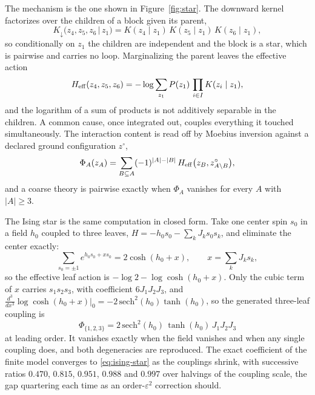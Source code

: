 \documentclass[11pt,letterpaper]{article}
\begin{document}
The mechanism is the one shown in Figure~\ref{fig:star}. The downward kernel
factorizes over the children of a block given its parent,
\begin{equation}
K_\downarrow\big(z_4,z_5,z_6\,\big\vert\,z_1\big)
= K(z_4\mid z_1)\,K(z_5\mid z_1)\,K(z_6\mid z_1),
\label{eq:star-factorized}
\end{equation}
so conditionally on $z_1$ the children are independent and the block is a star,
which is pairwise and carries no loop. Marginalizing the parent leaves the
effective action
\begin{equation}
H_{\rm eff}(z_4,z_5,z_6)
= -\log\sum_{z_1}P(z_1)\,\prod_{i\in I}K(z_i\mid z_1),
\label{eq:star-marginal}
\end{equation}
and the logarithm of a sum of products is not additively separable in the
children. A common cause, once integrated out, couples everything it touched
simultaneously. The interaction content is read off by Moebius inversion against a
declared ground configuration $z^\circ$,
\begin{equation}
\Phi_A(z_A)=\sum_{B\subseteq A}(-1)^{|A|-|B|}\,
H_{\rm eff}\big(z_B,z^\circ_{A\setminus B}\big),
\label{eq:mobius}
\end{equation}
and a coarse theory is pairwise exactly when $\Phi_A$ vanishes for every $A$ with
$|A|\ge3$.

The Ising star is the same computation in closed form. Take one center spin
$s_0$ in a field $h_0$ coupled to three leaves,
$H=-h_0s_0-\sum_{k}J_ks_0s_k$, and eliminate the center exactly:
\begin{equation}
\sum_{s_0=\pm1}e^{h_0s_0+xs_0}=2\cosh(h_0+x),
\qquad x=\sum_{k}J_ks_k,
\end{equation}
so the effective leaf action is $-\log 2-\log\cosh(h_0+x)$. Only the cubic term of
$x$ carries $s_1s_2s_3$, with coefficient $6J_1J_2J_3$, and
$\tfrac{d^3}{dx^3}\log\cosh(h_0+x)\big\vert_{0}=-2\,\mathrm{sech}^2(h_0)\tanh(h_0)$,
so the generated three-leaf coupling is
\begin{equation}
\Phi_{\{1,2,3\}}
=2\,\mathrm{sech}^2(h_0)\,\tanh(h_0)\,J_1J_2J_3
\label{eq:ising-star}
\end{equation}
at leading order. It vanishes exactly when the field vanishes and when any single
coupling does, and both degeneracies are reproduced. The exact coefficient of the
finite model converges to \eqref{eq:ising-star} as the couplings shrink, with
successive ratios $0.470$, $0.815$, $0.951$, $0.988$ and $0.997$ over halvings of
the coupling scale, the gap quartering each time as an order-$\varepsilon^2$
correction should.
\end{document}
